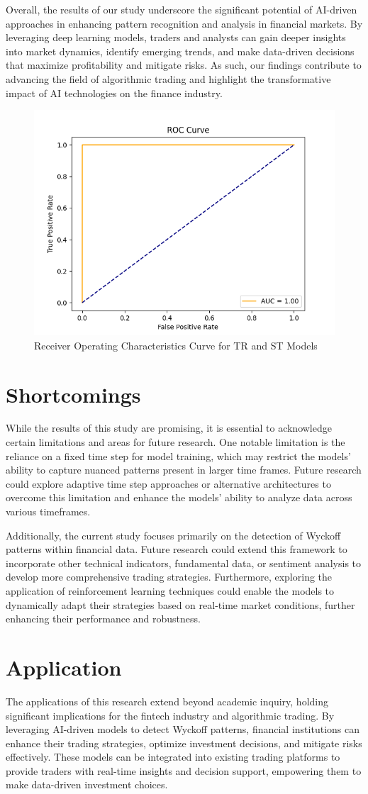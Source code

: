 \documentclass{article}
\begin{document}
Overall, the results of our study underscore the significant potential of AI-driven approaches in enhancing pattern recognition and analysis in financial markets. By leveraging deep learning models, traders and analysts can gain deeper insights into market dynamics, identify emerging trends, and make data-driven decisions that maximize profitability and mitigate risks. As such, our findings contribute to advancing the field of algorithmic trading and highlight the transformative impact of AI technologies on the finance industry.
\begin{figure}[ht]
	\centering
	\includegraphics[width=0.4\linewidth]{visuals/st_roc}
	\caption{Receiver Operating Characteristics Curve for TR and ST Models}
	\label{fig:stroc}
\end{figure}



\section{Shortcomings}
While the results of this study are promising, it is essential to acknowledge certain limitations and areas for future research. One notable limitation is the reliance on a fixed time step for model training, which may restrict the models' ability to capture nuanced patterns present in larger time frames. Future research could explore adaptive time step approaches or alternative architectures to overcome this limitation and enhance the models' ability to analyze data across various timeframes.

Additionally, the current study focuses primarily on the detection of Wyckoff patterns within financial data. Future research could extend this framework to incorporate other technical indicators, fundamental data, or sentiment analysis to develop more comprehensive trading strategies. Furthermore, exploring the application of reinforcement learning techniques could enable the models to dynamically adapt their strategies based on real-time market conditions, further enhancing their performance and robustness.


\section{Application}
The applications of this research extend beyond academic inquiry, holding significant implications for the fintech industry and algorithmic trading. By leveraging AI-driven models to detect Wyckoff patterns, financial institutions can enhance their trading strategies, optimize investment decisions, and mitigate risks effectively. These models can be integrated into existing trading platforms to provide traders with real-time insights and decision support, empowering them to make data-driven investment choices.
\end{document}
